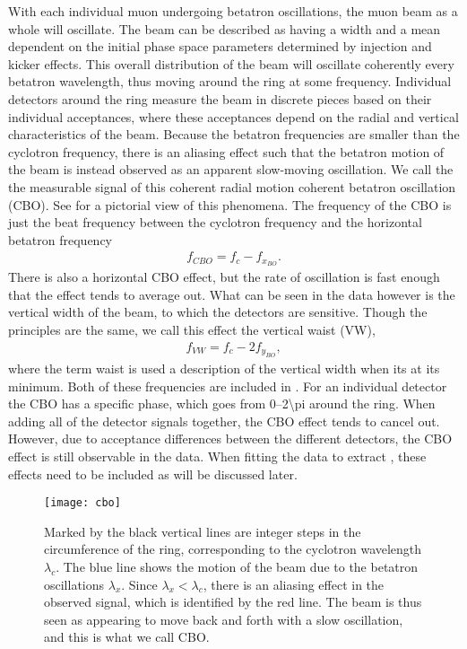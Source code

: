 With each individual muon undergoing betatron oscillations, the muon beam as a whole will oscillate. The beam can be described as having a width and a mean dependent on the initial phase space parameters determined by injection and kicker effects. This overall distribution of the beam will oscillate coherently every betatron wavelength, thus moving around the ring at some frequency. Individual detectors around the ring measure the beam in discrete pieces based on their individual acceptances, where these acceptances depend on the radial and vertical characteristics of the beam. Because the betatron frequencies are smaller than the cyclotron frequency, there is an aliasing effect such that the betatron motion of the beam is instead observed as an apparent slow-moving oscillation. We call the the measurable signal of this coherent radial motion coherent betatron oscillation (CBO). See  for a pictorial view of this phenomena. The frequency of the CBO is just the beat frequency between the cyclotron frequency and the horizontal betatron frequency
        \begin{align}
            f_{CBO} = f_{c}-f_{x_{BO}}.
        \end{align}
There is also a horizontal CBO effect, but the rate of oscillation is fast enough that the effect tends to average out. What can be seen in the data however is the vertical width of the beam, to which the detectors are sensitive. Though the principles are the same, we call this effect the vertical waist (VW),
        \begin{align}
            f_{VW} = f_{c}-2f_{y_{BO}},
        \end{align}
where the term waist is used a description of the vertical width when its at its minimum. Both of these frequencies are included in . For an individual detector the CBO has a specific phase, which goes from \SIrange{0}{2\pi}{} around the ring. When adding all of the detector signals together, the CBO effect tends to cancel out. However, due to acceptance differences between the different detectors, the CBO effect is still observable in the data. When fitting the data to extract \wa, these effects need to be included as will be discussed later.

\begin{figure}[]
    \centering
    \texttt{[image: cbo]}
    \caption[Coherent betatron oscillation]{Marked by the black vertical lines are integer steps in the circumference of the ring, corresponding to the cyclotron wavelength $\lambda_{c}$. The blue line shows the motion of the beam due to the betatron oscillations $\lambda_{x}$. Since $\lambda_{x} < \lambda_{c}$, there is an aliasing effect in the observed signal, which is identified by the red line. The beam is thus seen as appearing to move back and forth with a slow oscillation, and this is what we call CBO.}
    \label{fig:cbo}
\end{figure}


